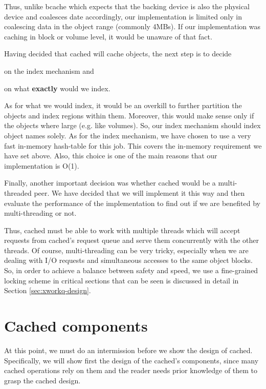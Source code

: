 Thus, unlike bcache which expects that the backing device is also the physical 
device and coalesces date accordingly, our implementation is limited only in 
coalescing data in the object range (commonly 4MBs). If our implementation was 
caching in block or volume level, it would be unaware of that fact. 

Having decided that cached will cache objects, the next step is to decide
\begin{inparaenum}[i)]
\item on the index mechanism and
\item on what \textbf{exactly} would we index.
\end{inparaenum}

As for what we would index, it would be an overkill to further partition the 
objects and index regions within them. Moreover, this would make sense only if 
the objects where large (e.g. like volumes). So, our index mechanism should 
index object names solely. As for the index mechanism, we have chosen to use a 
very fast in-memory hash-table for this job. This covers the in-memory 
requirement we have set above. Also, this choice is one of the main reasons 
that our implementation is O(1).

Finally, another important decision was whether cached would be a 
multi-threaded peer. We have decided that we will implement it this way and 
then evaluate the performance of the implementation to find out if we are 
benefited by multi-threading or not.

Thus, cached must be able to work with multiple threads which will accept 
requests from cached's request queue and serve them concurrently with the other 
threads. Of course, multi-threading can be very tricky, especially when we are 
dealing with I/O requests and simultaneous accesses to the same object blocks.  
So, in order to achieve a balance between safety and speed, we use a
fine-grained locking scheme in critical sections that can be seen is discussed 
in detail in Section \ref{sec:xworkq-design}.

\section{Cached components}\label{sec:comp-design}

At this point, we must do an intermission before we show the design of cached.  
Specifically, we will show first the design of the cached's components, since 
many cached operations rely on them and the reader needs prior knowledge of 
them to grasp the cached design.

